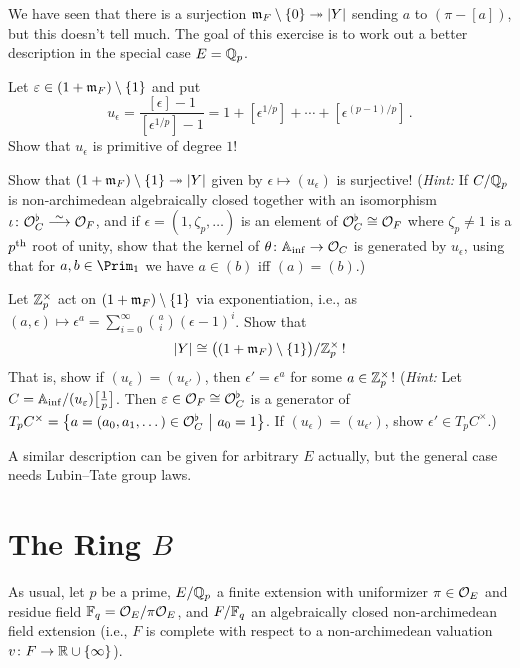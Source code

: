 \documentclass[a4paper, 10pt, oneside, DIV=9, chapterprefix=true, numbers=enddot,bibliography=totoc]{scrbook}
\begin{document}
\begin{exc}
	We have seen that there is a surjection $\mm_F\setminus\{0\}\epimorphism |Y|$ sending $a$ to $(\pi-[a])$, but this doesn't tell much. The goal of this exercise is to work out a better description in the special case $E=\mathbb{Q}_p$.
	\begin{numerate}
		\item Let $\varepsilon\in (1+\mathfrak{m}_F)\setminus\{1\}$ and put
		\begin{equation*}
			u_\epsilon=\frac{[\epsilon]-1}{[\epsilon^{1/p}]-1}=1+[\epsilon^{1/p}]+\dotsb+[\epsilon^{(p-1)/p}]\,.
		\end{equation*}
		Show that $u_\epsilon$ is primitive of degree $1$!
		\item Show that $(1+\mm_F)\setminus\{1\}\epimorphism |Y|$ given by $\epsilon\mapsto (u_\epsilon)$ is surjective!	{\footnotesize(\emph{Hint:} If $C/\mathbb{Q}_p$ is non-archimedean algebraically closed  together with an isomorphism $\iota\colon \Oo_C^\flat\isomorphism \Oo_F$, and if $\epsilon=(1,\zeta_p,\dotsc)$ is an element of $\mathcal{O}_C^\flat\cong \mathcal{O}_F$ where $\zeta_p\neq 1$ is a $p^{\text{th}}$ root of unity, show that the kernel of $\theta\colon \IA_\inf\morphism \Oo_C$ is generated by $u_\epsilon$, using that for $a,b\in\Prim_1$ we have $a\in(b)$ iff $(a)=(b)$.)}
		\item Let $\mathbb{Z}_p^\times$ act on $(1+\mathfrak{m}_F)\setminus\{1\}$ via exponentiation, i.e., as $(a,\epsilon)\mapsto \epsilon^a=\sum_{i=0}^\infty \binom{a}{i}(\epsilon-1)^i$. Show that
		\begin{equation*}
			|Y|\cong \big((1+\mathfrak{m}_F)\setminus\{1\}\big)/\mathbb{Z}_p^\times\,!
		\end{equation*}
		That is, show if $(u_\epsilon)=(u_{\epsilon'})$, then $\epsilon'=\epsilon^a$ for some $a\in \mathbb{Z}_p^\times$! {(\footnotesize\emph{Hint:} Let $C=\mathbb{A}_{\mathrm{inf}}/(u_\varepsilon)\big[\frac 1p\big]$. Then $\varepsilon\in\mathcal{O}_F\cong \mathcal{O}_C^\flat$ is a generator of $T_pC^\times=\left\{a=(a_0,a_1,\dotsc)\in\mathcal{O}_C^\flat\ \middle|\  a_0=1\right\}$. If $(u_\epsilon)=(u_{\epsilon'})$, show $\epsilon'\in T_pC^\times$.)} 
	\end{numerate}
	 A similar description can be given for arbitrary $E$  actually, but the general case needs Lubin--Tate group laws.
\end{exc}

\section{The Ring \texorpdfstring{$B$}{B}}
As usual, let $p$ be a prime, $E/\mathbb{Q}_p$ a finite extension with uniformizer $\pi\in\mathcal{O}_E$ and residue field $\mathbb{F}_q=\mathcal{O}_E/\pi \mathcal{O}_E$, and $F/\mathbb{F}_q$ an algebraically closed non-archimedean field extension (i.e., $F$ is complete with respect to a non-archimedean valuation $v\colon F\morphism \IR\cup\{\infty\}$).
\end{document}
